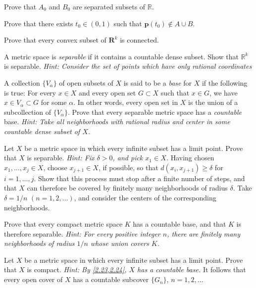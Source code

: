 \begin{exercise}
\begin{exercise}[label = (\alph*)]
  \item
    Prove that \(A_0\) and \(B_0\) are separated subsets of \(\mathbb{R}\).
  \item
    Prove that there exists \(t_0\in (0, 1)\) such that
    \(\mathbold{p}(t_0)\not\in A\cup B\).
  \item
    Prove that every convex subset of \(\mathbold{R}^k\) is connected.
  \end{exercise}
\item
  \label{2.22}
  A metric space is \textit{separable} if it contains a countable dense subset.
  Show that \(\mathbb{R}^k\) is separable.
  \textit{Hint: Consider the set of points which have only rational
    coordinates}
\item
  \label{2.23}
  A collection \(\{V_{\alpha}\}\) of open subsets of \(X\) is said to be a
  \textit{base} for \(X\) if the following is true: For every \(x\in X\) and
  every open set \(G\subset X\) such that \(x\in G\), we have
  \(x\in V_{\alpha}\subset G\) for some \(\alpha\).
  In other words, every open set in \(X\) is the union of a subcollection of
  \(\{V_{\alpha}\}\).
  Prove that every separable metric space has a \textit{countable} base.
  \textit{Hint: Take all neighborhoods with rational radius and center in some
    countable dense subset of \(X\).}
\item
  \label{2.24}
  Let \(X\) be a metric space in which every infinite subset has a limit point.
  Prove that \(X\) is separable.
  \textit{Hint: Fix \(\delta > 0\), and pick \(x_1\in X\).}
  Having chosen \(x_1,\ldots,x_j\in X\), choose \(x_{j + 1}\in X\), if
  possible, so that \(d(x_i, x_{j + 1})\geq\delta\) for \(i = 1,\ldots,j\).
  Show that this process must stop after a finite number of steps, and that
  \(X\) can therefore be covered by finitely many neighborhoods of radius
  \(\delta\).
  Take \(\delta = 1/n\) \((n = 1,2,\ldots)\), and consider the centers of the
  corresponding neighborhoods.
\item
  Prove that every compact metric space \(K\) has a countable base, and that
  \(K\) is therefore separable.
  \textit{Hint: For every positive integer \(n\), there are finitely many
    neighborhoods of radius \(1/n\) whose union covers \(K\).}
\item
  Let \(X\) be a metric space in which every infinite subset has a limit point.
  Prove that \(X\) is compact.
  \textit{Hint: By \cref{2.23,2.24}, \(X\) has a countable base.}
  It follows that every open cover of \(X\) has a countable subcover
  \(\{G_n\}\), \(n = 1,2,\ldots\)

\end{exercise}
